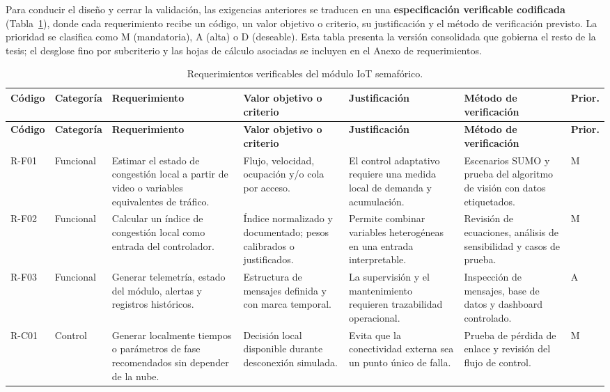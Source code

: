 Para conducir el diseño y cerrar la validación, las exigencias anteriores se traducen en una
\textbf{especificación verificable codificada} (Tabla~\ref{tab:req-verificables}), donde cada requerimiento
recibe un código, un valor objetivo o criterio, su justificación y el método de verificación previsto. La
prioridad se clasifica como M (mandatoria), A (alta) o D (deseable). Esta tabla presenta la versión
consolidada que gobierna el resto de la tesis; el desglose fino por subcriterio y las hojas de cálculo
asociadas se incluyen en el Anexo de requerimientos.

\begin{landscape}
\footnotesize
\begin{longtable}{@{}p{1.15cm}p{1.7cm}p{5.1cm}p{3.1cm}p{4.2cm}p{3.6cm}p{1.0cm}@{}}
\caption{Requerimientos verificables del módulo IoT semafórico.}\label{tab:req-verificables}\\
\toprule
\textbf{Código} & \textbf{Categoría} & \textbf{Requerimiento} & \textbf{Valor objetivo o criterio} & \textbf{Justificación} & \textbf{Método de verificación} & \textbf{Prior.}\\
\midrule
\endfirsthead
\toprule
\textbf{Código} & \textbf{Categoría} & \textbf{Requerimiento} & \textbf{Valor objetivo o criterio} & \textbf{Justificación} & \textbf{Método de verificación} & \textbf{Prior.}\\
\midrule
\endhead
\bottomrule
\endfoot
R-F01 & Funcional & Estimar el estado de congestión local a partir de video o variables equivalentes de tráfico. & Flujo, velocidad, ocupación y/o cola por acceso. & El control adaptativo requiere una medida local de demanda y acumulación. & Escenarios SUMO y prueba del algoritmo de visión con datos etiquetados. & M\\
R-F02 & Funcional & Calcular un índice de congestión local como entrada del controlador. & Índice normalizado y documentado; pesos calibrados o justificados. & Permite combinar variables heterogéneas en una entrada interpretable. & Revisión de ecuaciones, análisis de sensibilidad y casos de prueba. & M\\
R-F03 & Funcional & Generar telemetría, estado del módulo, alertas y registros históricos. & Estructura de mensajes definida y con marca temporal. & La supervisión y el mantenimiento requieren trazabilidad operacional. & Inspección de mensajes, base de datos y dashboard controlado. & A\\
R-C01 & Control & Generar localmente tiempos o parámetros de fase recomendados sin depender de la nube. & Decisión local disponible durante desconexión simulada. & Evita que la conectividad externa sea un punto único de falla. & Prueba de pérdida de enlace y revisión del flujo de control. & M\\

\end{longtable}
\end{landscape}
